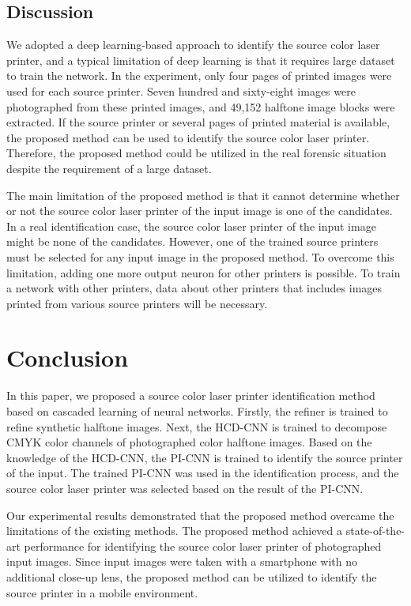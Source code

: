 \documentclass[5p, times]{elsarticle}
\begin{document}
\subsection{Discussion}
We adopted a deep learning-based approach to identify the source color laser printer, and a typical limitation of deep learning is that it requires large dataset to train the network. In the experiment, only four pages of printed images were used for each source printer. Seven hundred and sixty-eight images were photographed from these printed images, and 49,152 halftone image blocks were extracted. If the source printer or several pages of printed material is available, the proposed method can be used to identify the source color laser printer. Therefore, the proposed method could be utilized in the real forensic situation despite the requirement of a large dataset.

The main limitation of the proposed method is that it cannot determine whether or not the source color laser printer of the input image is one of the candidates. In a real identification case, the source color laser printer of the input image might be none of the candidates. However, one of the trained source printers must be selected for any input image in the proposed method. To overcome this limitation, adding one more output neuron for other printers is possible. To train a network with other printers, data about other printers that includes images printed from various source printers will be necessary.

\section{Conclusion}
In this paper, we proposed a source color laser printer identification method based on cascaded learning of neural networks. Firstly, the refiner is trained to refine synthetic halftone images. Next, the HCD-CNN is trained to decompose CMYK color channels of photographed color halftone images. Based on the knowledge of the HCD-CNN, the PI-CNN is trained to identify the source printer of the input. The trained PI-CNN was used in the identification process, and the source color laser printer was selected based on the result of the PI-CNN.

Our experimental results demonstrated that the proposed method overcame the limitations of the existing methods. The proposed method achieved a state-of-the-art performance for identifying the source color laser printer of photographed input images. Since input images were taken with a smartphone with no additional close-up lens, the proposed method can be utilized to identify the source printer in a mobile environment.
\end{document}
